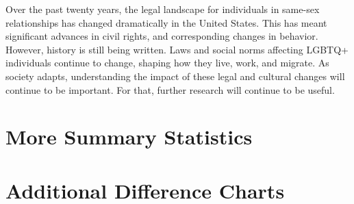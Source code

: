 \documentclass[12pt,letterpaper]{article}
\begin{document}
Over the past twenty years, the legal landscape for individuals in same-sex relationships has changed dramatically in the United States. This has meant significant advances in civil rights, and corresponding changes in behavior. However, history is still being written. Laws and social norms affecting LGBTQ+ individuals continue to change, shaping how they live, work, and migrate. As society adapts, understanding the impact of these legal and cultural changes will continue to be important. For that, further research will continue to be useful.

\newpage



\newpage
\appendix
{}  %
\FloatBarrier

\section{More Summary Statistics}



\begin{landscape}

\end{landscape}


\FloatBarrier
\newpage
\section{Additional Difference Charts}




\end{document}
